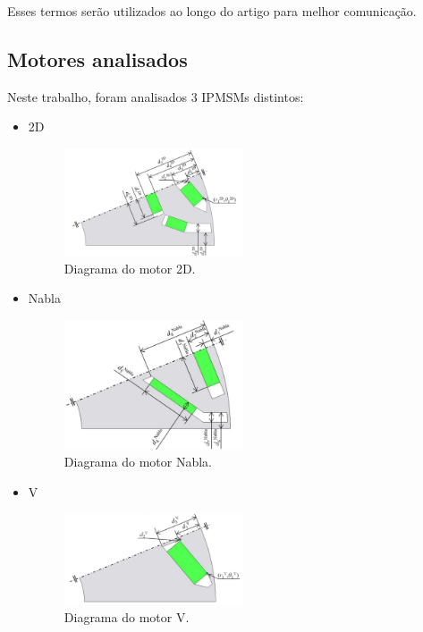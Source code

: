 \documentclass{article}
\begin{document}
\noindent Esses termos serão utilizados ao longo do artigo para melhor comunicação.


\newpage


\subsection{Motores analisados}

\noindent Neste trabalho, foram analisados 3 IPMSMs distintos:

\begin{itemize}
    \item 2D
    \\
        \begin{figure}[htbp]
            \centering
            \includegraphics[width=0.5\textwidth]{images/diagram_2d.png}
            \caption{Diagrama do motor 2D.}
            \label{fig:diagram_2d}
        \end{figure}
    \item Nabla
    \\
        \begin{figure}[htbp]
            \centering
            \includegraphics[width=0.5\textwidth]{images/diagram_nabla.png}
            \caption{Diagrama do motor Nabla.}
            \label{fig:diagram_nabla}
        \end{figure}
    \item V
    \\
        \begin{figure}[htbp]
            \centering
            \includegraphics[width=0.5\textwidth]{images/diagram_v.png}
            \caption{Diagrama do motor V.}
            \label{fig:diagram_v}
        \end{figure}
\end{itemize}
\end{document}
